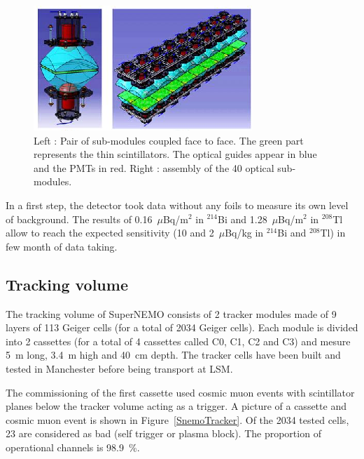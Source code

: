 \documentclass[main.tex]{subfiles}
\begin{document}
\begin{figure}[h!]
\begin{center}
\includegraphics[scale=1.1]{pictures/Chap3/snemo_bipo.png}
\caption{Left : Pair of sub-modules coupled face to face. The green part represents the thin scintillators. The optical guides appear in blue and the PMTs in red. Right : assembly of the 40 optical sub-modules.}
\label{BiPoDetector}
\end{center}
\end{figure}


\bigskip


\NI In a first step, the detector took data without any foils to measure its own level of background. The results of 0.16~$\mu$Bq/m$^\text{2}$ in $^{\text{214}}$Bi and 1.28~$\mu$Bq/m$^\text{2}$ in $^{\text{208}}$Tl allow to reach the expected sensitivity (10 and 2~$\mu$Bq/kg in $^{\text{214}}$Bi and $^{\text{208}}$Tl) in few month of data taking.

\FloatBarrier


\subsection{Tracking volume}


\NI The tracking volume of SuperNEMO consists of 2 tracker modules made of 9 layers of 113 Geiger cells (for a total of 2034 Geiger cells). Each module is divided into 2 cassettes (for a total of 4 cassettes called C0, C1, C2 and C3) and mesure 5~m long, 3.4~m high and 40~cm depth. The tracker cells have been built and tested in Manchester before being transport at LSM.


\bigskip


\NI The commissioning of the first cassette used cosmic muon events with scintillator planes below the tracker volume 
acting as a trigger. A picture of a cassette and cosmic muon event is shown in Figure~\ref{SnemoTracker}. Of the 2034 tested cells, 23 are considered as bad (self trigger or plasma block). The proportion of operational channels is 98.9~\%. 
\end{document}
